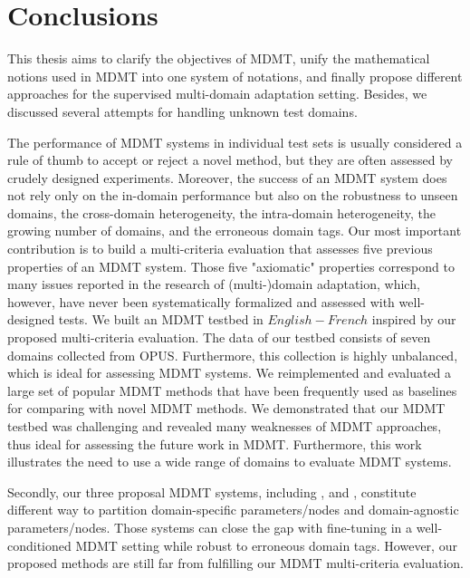 \chapter{Conclusions}
\label{chap:conclusion}
This thesis aims to clarify the objectives of MDMT, unify the mathematical notions used in MDMT into one system of notations, and finally propose different approaches for the supervised multi-domain adaptation setting. Besides, we discussed several attempts for handling unknown test domains.

The performance of MDMT systems in individual test sets is usually considered a rule of thumb to accept or reject a novel method, but they are often assessed by crudely designed experiments. Moreover, the success of an MDMT system does not rely only on the in-domain performance but also on the robustness to unseen domains, the cross-domain heterogeneity, the intra-domain heterogeneity, the growing number of domains, and the erroneous domain tags. Our most important contribution is to build a multi-criteria evaluation that assesses five previous properties of an MDMT system. Those five "axiomatic" properties correspond to many issues reported in the research of (multi-)domain adaptation, which, however, have never been systematically formalized and assessed with well-designed tests. We built an MDMT testbed in $English-French$ inspired by our proposed multi-criteria evaluation. The data of our testbed consists of seven domains collected from OPUS. Furthermore, this collection is highly unbalanced, which is ideal for assessing MDMT systems. We reimplemented and evaluated a large set of popular MDMT methods that have been frequently used as baselines for comparing with novel MDMT methods. We demonstrated that our MDMT testbed was challenging and revealed many weaknesses of MDMT approaches, thus ideal for assessing the future work in MDMT. Furthermore, this work illustrates the need to use a wide range of domains to evaluate MDMT systems.

Secondly, our three proposal MDMT systems, including ,  and , constitute different way to partition domain-specific parameters/nodes and domain-agnostic parameters/nodes. Those systems can close the gap with fine-tuning in a well-conditioned MDMT setting while robust to erroneous domain tags. However, our proposed methods are still far from fulfilling our MDMT multi-criteria evaluation.

